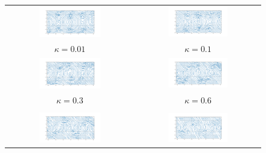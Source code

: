 \documentclass[oneside,solution]{tmpl}
\begin{document}
\begin{figure}
\begin{tabular}{cc}
  \includegraphics[width=0.5\textwidth]{images/hw_4/phase_0.01.png} &   \includegraphics[width=0.5\textwidth]{images/hw_4/phase_0.1.png} \\
 $\kappa=0.01$ & $\kappa=0.1$ \\[6pt]
 \includegraphics[width=0.5\textwidth]{images/hw_4/phase_0.3.png} &   \includegraphics[width=0.5\textwidth]{images/hw_4/phase_0.6.png} \\
  $\kappa=0.3$ & $\kappa=0.6$ \\[6pt] \\[6pt]
 \includegraphics[width=0.5\textwidth]{images/hw_4/phase_1.0.png} &   \includegraphics[width=0.5\textwidth]{images/hw_4/phase_1.5.png} \\

\end{tabular}
\end{figure}
\end{document}
